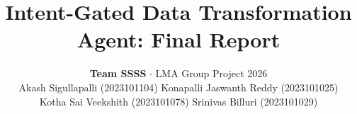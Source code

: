 \documentclass[11pt]{article}
\title{Intent-Gated Data Transformation Agent: Final Report}
\author{\textbf{Team SSSS} $\cdot$ LMA Group Project 2026 \\[4pt]
  Akash Sigullapalli (2023101104) \quad Konapalli Jaswanth Reddy (2023101025) \\
  Kotha Sai Veekshith (2023101078) \quad Srinivas Billuri (2023101029)}
\begin{document}
\maketitle
\begin{abstract}
\end{abstract}

\end{document}
